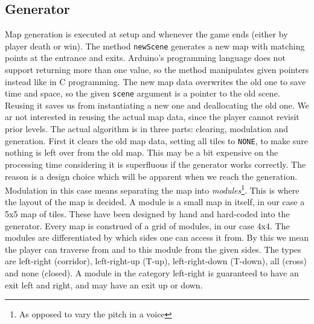 \subsection*{Generator} %
Map generation is executed at setup and whenever the game ends (either by player death or win). The method {\tt newScene} generates a new map with matching points at the entrance and exits. Arduino's programming language does not support returning more than one value, so the method manipulates given pointers instead like in C programming. The new map data overwrites the old one to save time and space, so the given {\tt scene} argument is a pointer to the old scene.  Reusing it saves us from instantiating a new one and deallocating the old one.  We ar not interested in reusing the actual map data, since the player cannot revisit prior levels.
\newline
The actual algorithm is in three parts: clearing, modulation and generation. First it clears the old map data, setting all tiles to {\tt NONE}, to make sure nothing is left over from the old map. This may be a bit expensive on the processing time considering it is superfluous if the generator works correctly. The reason is a design choice which will be apparent when we reach the generation. %
\newline
Modulation in this case means separating the map into \emph{modules}\footnote{As opposed to vary the pitch in a voice}. This is where the layout of the map is decided. A module is a small map in itself, in our case a 5x5 map of tiles.  These have been designed by hand and hard-coded into the generator. Every map is construed of a grid of modules, in our case 4x4. The modules are differentiated by which sides one can access it from.  By this we mean the player can traverse from and to this module from the given sides.  The types are left-right (corridor), left-right-up (T-up), left-right-down (T-down), all (cross) and none (closed). A module in the category left-right is guaranteed to have an exit left and right, and may have an exit up or down.
\newline
